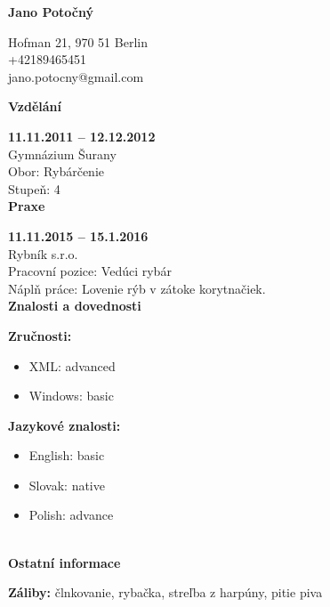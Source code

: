 \documentclass[12pt, a4paper]{article}
\begin{document}
        \begin{center} \huge \bfseries Jano Potočný\end{center}
Hofman 21, 970 51 Berlin\\
+42189465451\\
jano.potocny@gmail.com\\

{\hrulefill \large \bfseries Vzdělání\hrulefill}

\vspace{0.2cm}
{\bfseries 11.11.2011 -- 12.12.2012}\\Gymnázium Šurany\\Obor: Rybárčenie\\Stupeň: 4\\

{\hrulefill \large \bfseries Praxe\hrulefill}

\vspace{0.2cm}
{\bfseries 11.11.2015 -- 15.1.2016}\\Rybník s.r.o.\\ Pracovní pozice: Vedúci rybár\\ Náplň práce: Lovenie rýb v zátoke korytnačiek.\\

{\hrulefill \large \bfseries Znalosti a dovednosti\hrulefill}

\vspace{0.2cm}\begin{minipage}[t]{6cm}{\bfseries Zručnosti:}
    \begin{itemize}[leftmargin=0.5cm,topsep=0cm]
    \setlength\itemsep{-0.2cm}\item XML: advanced\item Windows: basic\end{itemize}\end{minipage}\begin{minipage}[t]{6cm}{\bfseries Jazykové znalosti:}
    \begin{itemize}[leftmargin=0.5cm,topsep=0cm]
    \setlength\itemsep{-0.2cm}\item English: basic\item Slovak: native\item Polish: advance\end{itemize}\end{minipage} \\

{\hrulefill \large \bfseries Ostatní informace\hrulefill}

\vspace{0.2cm}
{\bfseries Záliby:} člnkovanie, rybačka, streľba z harpúny, pitie piva
\end{document}
